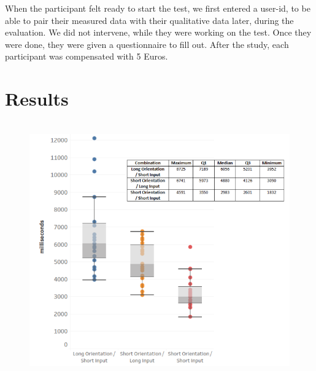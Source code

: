 When the participant felt ready to start the test, we first entered a user-id, to be able to pair their measured data with their qualitative data later, during the evaluation. We did not intervene, while they were working on the test. Once they were done, they were given a questionnaire to fill out. After the study, each participant was compensated with 5 Euros.

\section{Results}

\begin{figure}[t!]
\centering
\includegraphics[width=13cm, height=11cm]{Chapters/graphics/Combinations.png}
\caption{}
\label{fig:combination}
\end{figure}


